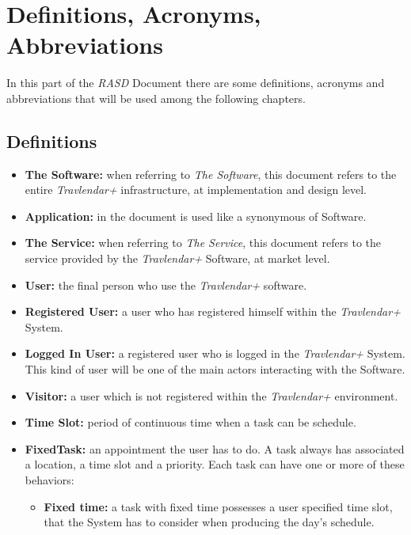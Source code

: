 \newpage
\section{Definitions, Acronyms, Abbreviations}

In this part of the \emph{RASD} Document there are some definitions, acronyms and abbreviations that will be used among the following chapters.

\subsection{Definitions}
\begin{itemize}
	\item \textbf{The Software:} when referring to \emph{The Software}, this document refers to the entire \emph{Travlendar+} infrastructure, at implementation and design level.
        
    \item \textbf{Application:} in the document is used like a synonymous of Software.
  
    \item \textbf{The Service:}  when referring to \emph{The Service}, this document refers to the service provided by the \emph{Travlendar+} Software, at market level.
      
    \item \textbf{User:} the final person who use the \emph{Travlendar+} software.
    
    \item \textbf{Registered User:} a user who has registered himself within the \emph{Travlendar+} System.
    
    \item \textbf{Logged In User:} a registered user who is logged in the \emph{Travlendar+} System. This kind of user will be one of the main actors interacting with the Software.
    
    \item \textbf{Visitor:} a user which is not registered within the \emph{Travlendar+} environment.
    
    \item \textbf{Time Slot:} period of continuous time when a task can be schedule.
    
	\item \textbf{FixedTask:} an appointment the user has to do. A task always has associated a location, a time slot and a priority. Each task can have one or more of these behaviors:
    \begin{itemize}
        \item \textbf{Fixed time:} a task with fixed time possesses a user specified time slot, that the System has to consider when producing the day's schedule.


\end{itemize}
\end{itemize}
